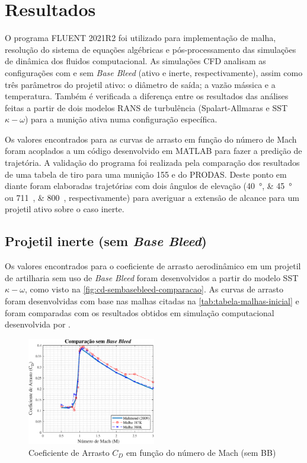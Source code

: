 \chapter{Resultados}\label{cap:resultados}
\graphicspath{{chapter-07/img-cap07/}}

O programa FLUENT 2021R2 \cite{fluent2021ansys} foi utilizado para implementação de malha, resolução do sistema de equações algébricas e pós-processamento das simulações de dinâmica dos fluidos computacional. As simulações CFD analisam as configurações com e sem \textit{Base Bleed} (ativo e inerte, respectivamente), assim como três parâmetros do projetil ativo: o diâmetro de saída; a vazão mássica e a temperatura. Também é verificada a diferença entre os resultados das análises feitas a partir de dois modelos RANS de turbulência (Spalart-Allmaras e SST \(\kappa-\omega\)) para a munição ativa numa configuração específica.

Os valores encontrados para as curvas de arrasto em função do número de Mach foram acoplados a um código desenvolvido em MATLAB para fazer a predição de trajetória. A validação do programa foi realizada pela comparação dos resultados de uma tabela de tiro para uma munição \qty{155}{\millimetre} e do PRODAS. Deste ponto em diante foram elaboradas trajetórias com dois ângulos de elevação (\qtylist{40;45}{\degree} ou \qtylist{711;800}{\milliradian}, respectivamente) para averiguar a extensão de alcance para um projetil ativo sobre o caso inerte.

\section{Projetil inerte (sem \textit{Base Bleed})}\label{sec:resultados-sem-basebleed}

Os valores encontrados para o coeficiente de arrasto aerodinâmico em um projetil de artilharia sem uso de \textit{Base Bleed} foram desenvolvidos a partir do modelo SST \(\kappa-\omega\), como visto na \autoref{fig:cd-sembasebleed-comparacao}. As curvas de arrasto foram desenvolvidas com base nas malhas citadas na \autoref{tab:tabela-malhas-inicial} e foram comparadas com os resultados obtidos em simulação computacional desenvolvida por \citeauthor{Mahmoud2009}. 

\begin{figure}[!htpb]
	\centering
	\includegraphics[width=0.5\textwidth]{cd-sembasebleed-comparacao.eps}
	\caption{Coeficiente de Arrasto \(C_{D}\) em função do número de Mach (sem BB)}
	\label{fig:cd-sembasebleed-comparacao}
\end{figure}


